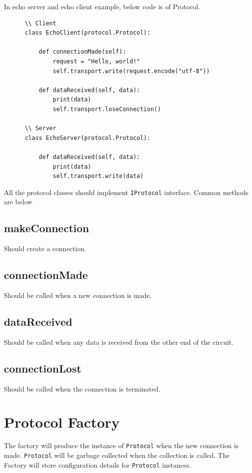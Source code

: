 \documentclass{article}
\begin{document}
    In echo server and echo client example, below code is of Protocol.

    \begin{verbatim}
      \\ Client
      class EchoClient(protocol.Protocol):

          def connectionMade(self):
              request = "Hello, world!"
              self.transport.write(request.encode("utf-8"))

          def dataReceived(self, data):
              print(data)
              self.transport.loseConnection()

      \\ Server
      class EchoServer(protocol.Protocol):

          def dataReceived(self, data):
              print(data)
              self.transport.write(data)
    \end{verbatim}

    All the protocol classes should implement \texttt{IProtocol} interface.
    Common methods are below

    \subsection{makeConnection} Should create a connection.

    \subsection{connectionMade} Should be called when a new connection is made.

    \subsection{dataReceived} Should be called when any data is received from
    the other end of the circuit.

    \subsection{connectionLost} Should be called when the connection is
    terminated.

  \section{Protocol Factory}
    The factory will produce the instance of \texttt{Protocol} when the new
    connection is made. \texttt{Protocol} will be garbage collected when the
    collection is called. The Factory will store configuration details for
    \texttt{Protocol} instances.
\end{document}

